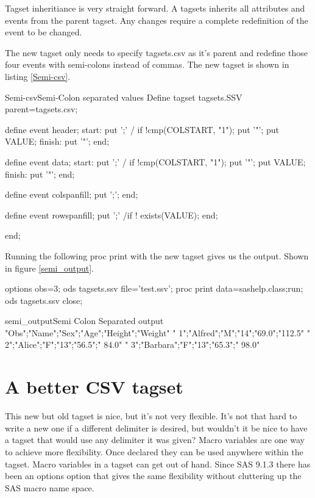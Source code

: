 Tagset inheritiance is very straight forward.  A tagsets inherits all attributes
and events from the parent tagset.  Any changes require a complete redefinition of
the event to be changed.

The new tagset only needs to specify tagsets.csv as it's parent and redefine those
four events with semi-colons instead of commas.  The new tagset is shown in 
listing \vref{Semi-csv}.


\begin {fvcode}{Semi-csv}{Semi-Colon separated values}
    Define tagset tagsets.SSV
        parent=tagsets.csv;
    
        define event header;
            start:
                put ';' / if !cmp(COLSTART, "1");
                put '"';
                put VALUE;
            finish:
                put '"';
        end;

        define event data;
            start:
                put ';' / if !cmp(COLSTART, "1");
                put '"';
                put VALUE;
            finish:
                put '"';
        end;

        define event colspanfill;
            put ';';
        end;    

        define event rowspanfill;
            put ';' /if ! exists(VALUE);
        end;

     end; 
\end{fvcode}

Running the following proc print 
with the new tagset gives us the output.
Shown in figure \vref{semi_output}.
\begin{sfvcode}
options obs=3;
ods tagsets.ssv file='test.ssv';
proc print data=sashelp.class;run;
ods tagsets.ssv close;
\end{sfvcode}

\begin{poutput}{semi_output}{Semi Colon Separated output}
"Obs";"Name";"Sex";"Age";"Height";"Weight"
" 1";"Alfred";"M";"14";"69.0";"112.5"
" 2";"Alice";"F";"13";"56.5";" 84.0"
" 3";"Barbara";"F";"13";"65.3";" 98.0"
\end{poutput}
       
\section{A better CSV tagset}
This new but old tagset is nice, but it's not very flexible.  It's not that
hard to write a new one if a different delimiter is desired, but wouldn't
it be nice to have a tagset that would use any delimiter it was given?
Macro variables are one way to achieve more flexibility.  Once declared
they can be used anywhere within the tagset.  Macro variables in a tagset
can get out of hand.  Since SAS 9.1.3 there has been an options option that
gives the same flexibility without cluttering up the SAS macro name space.

